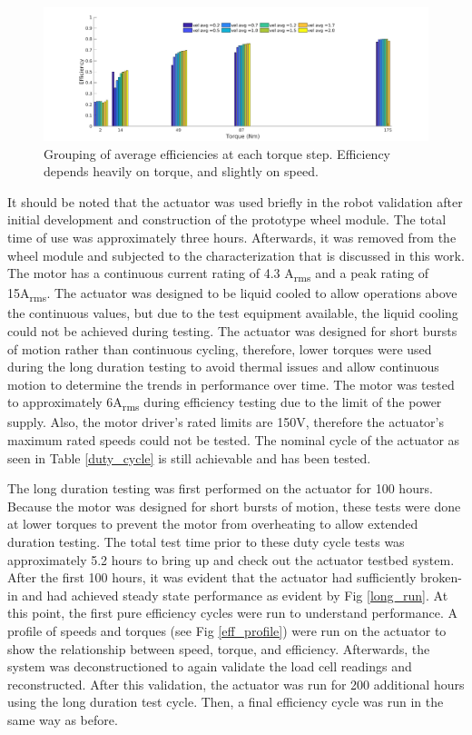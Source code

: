 \begin{figure}[t]
	\centering
	\includegraphics[width=0.8\linewidth]{images/eff_final}
	\caption{Grouping of average efficiencies at each torque step.
		Efficiency depends heavily on torque, and slightly on speed.}
	\label{eff_results}
\end{figure}

It should be noted that the actuator was used briefly in the robot validation after initial development and construction of the prototype wheel module.
The total time of use was approximately three hours.
Afterwards, it was removed from the wheel module and subjected to the characterization that is discussed in this work.
The motor has a continuous current rating of 4.3 A\textsubscript{rms} and a peak rating of 15A\textsubscript{rms}.
The actuator was designed to be liquid cooled to allow operations above the continuous values, but due to the test equipment available, the liquid cooling could not be achieved during testing.
The actuator was designed for short bursts of motion rather than continuous cycling, therefore, lower torques were used during the long duration testing to avoid thermal issues and allow continuous motion to determine the trends in performance over time.
The motor was tested to approximately 6A\textsubscript{rms} during efficiency testing due to the limit of the power supply.
Also, the motor driver's rated limits are 150V, therefore the actuator's maximum rated speeds could not be tested.
The nominal cycle of the actuator as seen in Table \ref{duty_cycle} is still achievable and has been tested.

The long duration testing was first performed on the actuator for 100 hours. Because the motor was designed for short bursts of motion, these tests were done at lower torques to prevent the motor from overheating to allow extended duration testing. The total test time prior to these duty cycle tests was approximately 5.2 hours to bring up and check out the actuator testbed system.
After the first 100 hours, it was evident that the actuator had sufficiently broken-in and had achieved steady state performance as evident by Fig \ref{long_run}. At this point, the first pure efficiency cycles were run to understand performance. A profile of speeds and torques (see Fig \ref{eff_profile}) were run on the actuator to show the relationship between speed, torque, and efficiency. Afterwards, the system was deconstructioned to again validate the load cell readings and reconstructed.
After this validation, the actuator was run for 200 additional hours using the long duration test cycle. Then, a final efficiency cycle was run in the same way as before. 


